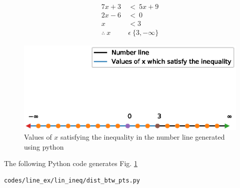 \begin{align}
7x+3\ &<\ 5x+9 \\
2x - 6\  &< \  0 \\
x &< 3 \\
\therefore\  x\  &\epsilon\  \{3, -\infty \}
\end{align}

\begin{figure}[!ht]
\centering
\includegraphics[width=\columnwidth]{./figs/line_ex/lin_ineq/number_line.eps}
\caption{Values of $x$ satisfying the inequality in the number line generated using python}
\label{fig:numberline_lin_ineq}
\end{figure} 

The  following Python code generates Fig. \ref{fig:numberline_lin_ineq}
\begin{lstlisting}
codes/line_ex/lin_ineq/dist_btw_pts.py
\end{lstlisting}



